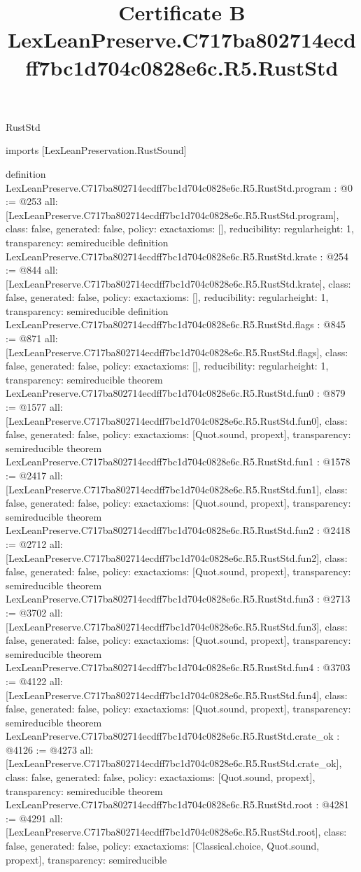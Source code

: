 \begin{lexlean}{RustStd}
\title{Certificate B LexLeanPreserve.C717ba802714ecdff7bc1d704c0828e6c.R5.RustStd}
\begin{coremodule}
imports [LexLeanPreservation.RustSound]

definition LexLeanPreserve.C717ba802714ecdff7bc1d704c0828e6c.R5.RustStd.program : @0 := @253 {
  all: [LexLeanPreserve.C717ba802714ecdff7bc1d704c0828e6c.R5.RustStd.program],
  class: false,
  generated: false,
  policy: exact{axioms: []},
  reducibility: regular{height: 1},
  transparency: semireducible
}
definition LexLeanPreserve.C717ba802714ecdff7bc1d704c0828e6c.R5.RustStd.krate : @254 := @844 {
  all: [LexLeanPreserve.C717ba802714ecdff7bc1d704c0828e6c.R5.RustStd.krate],
  class: false,
  generated: false,
  policy: exact{axioms: []},
  reducibility: regular{height: 1},
  transparency: semireducible
}
definition LexLeanPreserve.C717ba802714ecdff7bc1d704c0828e6c.R5.RustStd.flags : @845 := @871 {
  all: [LexLeanPreserve.C717ba802714ecdff7bc1d704c0828e6c.R5.RustStd.flags],
  class: false,
  generated: false,
  policy: exact{axioms: []},
  reducibility: regular{height: 1},
  transparency: semireducible
}
theorem LexLeanPreserve.C717ba802714ecdff7bc1d704c0828e6c.R5.RustStd.fun0 : @879 := @1577 {
  all: [LexLeanPreserve.C717ba802714ecdff7bc1d704c0828e6c.R5.RustStd.fun0],
  class: false,
  generated: false,
  policy: exact{axioms: [Quot.sound, propext]},
  transparency: semireducible
}
theorem LexLeanPreserve.C717ba802714ecdff7bc1d704c0828e6c.R5.RustStd.fun1 : @1578 := @2417 {
  all: [LexLeanPreserve.C717ba802714ecdff7bc1d704c0828e6c.R5.RustStd.fun1],
  class: false,
  generated: false,
  policy: exact{axioms: [Quot.sound, propext]},
  transparency: semireducible
}
theorem LexLeanPreserve.C717ba802714ecdff7bc1d704c0828e6c.R5.RustStd.fun2 : @2418 := @2712 {
  all: [LexLeanPreserve.C717ba802714ecdff7bc1d704c0828e6c.R5.RustStd.fun2],
  class: false,
  generated: false,
  policy: exact{axioms: [Quot.sound, propext]},
  transparency: semireducible
}
theorem LexLeanPreserve.C717ba802714ecdff7bc1d704c0828e6c.R5.RustStd.fun3 : @2713 := @3702 {
  all: [LexLeanPreserve.C717ba802714ecdff7bc1d704c0828e6c.R5.RustStd.fun3],
  class: false,
  generated: false,
  policy: exact{axioms: [Quot.sound, propext]},
  transparency: semireducible
}
theorem LexLeanPreserve.C717ba802714ecdff7bc1d704c0828e6c.R5.RustStd.fun4 : @3703 := @4122 {
  all: [LexLeanPreserve.C717ba802714ecdff7bc1d704c0828e6c.R5.RustStd.fun4],
  class: false,
  generated: false,
  policy: exact{axioms: [Quot.sound, propext]},
  transparency: semireducible
}
theorem LexLeanPreserve.C717ba802714ecdff7bc1d704c0828e6c.R5.RustStd.crate_ok : @4126 := @4273 {
  all: [LexLeanPreserve.C717ba802714ecdff7bc1d704c0828e6c.R5.RustStd.crate_ok],
  class: false,
  generated: false,
  policy: exact{axioms: [Quot.sound, propext]},
  transparency: semireducible
}
theorem LexLeanPreserve.C717ba802714ecdff7bc1d704c0828e6c.R5.RustStd.root : @4281 := @4291 {
  all: [LexLeanPreserve.C717ba802714ecdff7bc1d704c0828e6c.R5.RustStd.root],
  class: false,
  generated: false,
  policy: exact{axioms: [Classical.choice, Quot.sound, propext]},
  transparency: semireducible
}


\end{coremodule}
\end{lexlean}
